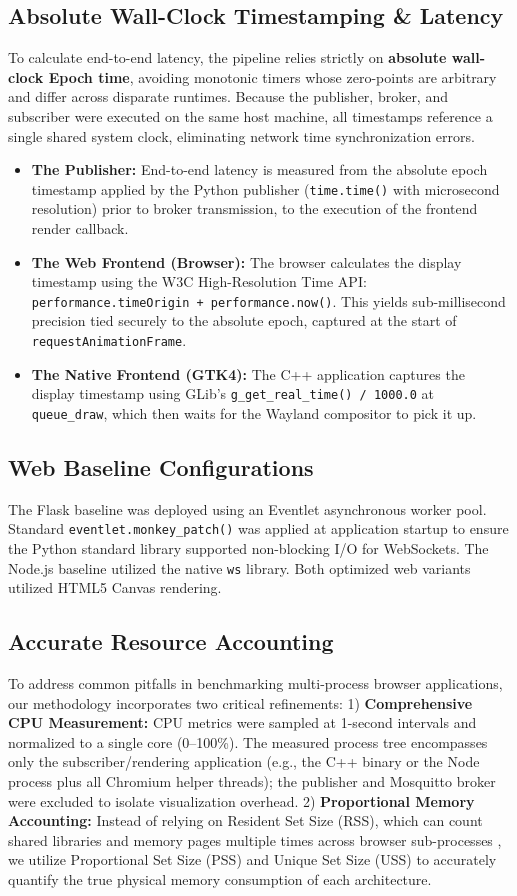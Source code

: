 \documentclass[lettersize,journal]{IEEEtran}
\begin{document}
\subsection{Absolute Wall-Clock Timestamping \& Latency}
To calculate end-to-end latency, the pipeline relies strictly on \textbf{absolute wall-clock Epoch time}, avoiding monotonic timers whose zero-points are arbitrary and differ across disparate runtimes. Because the publisher, broker, and subscriber were executed on the same host machine, all timestamps reference a single shared system clock, eliminating network time synchronization errors.
\begin{itemize}
    \item \textbf{The Publisher:} End-to-end latency is measured from the absolute epoch timestamp applied by the Python publisher (\texttt{time.time()} with microsecond resolution) prior to broker transmission, to the execution of the frontend render callback.
    \item \textbf{The Web Frontend (Browser):} The browser calculates the display timestamp using the W3C High-Resolution Time API: \texttt{performance.timeOrigin + performance.now()}. This yields sub-millisecond precision tied securely to the absolute epoch, captured at the start of \texttt{requestAnimationFrame}.
    \item \textbf{The Native Frontend (GTK4):} The C++ application captures the display timestamp using GLib's \texttt{g\_get\_real\_time() / 1000.0} at \texttt{queue\_draw}, which then waits for the Wayland compositor to pick it up.
\end{itemize}

\subsection{Web Baseline Configurations}
The Flask baseline was deployed using an Eventlet asynchronous worker pool. Standard \texttt{eventlet.monkey\_patch()} was applied at application startup to ensure the Python standard library supported non-blocking I/O for WebSockets. The Node.js baseline utilized the native \texttt{ws} library. Both optimized web variants utilized HTML5 Canvas rendering.

\subsection{Accurate Resource Accounting}
To address common pitfalls in benchmarking multi-process browser applications, our methodology incorporates two critical refinements:
1) \textbf{Comprehensive CPU Measurement:} CPU metrics were sampled at 1-second intervals and normalized to a single core (0--100\%). The measured process tree encompasses only the subscriber/rendering application (e.g., the C++ binary or the Node process plus all Chromium helper threads); the publisher and Mosquitto broker were excluded to isolate visualization overhead.
2) \textbf{Proportional Memory Accounting:} Instead of relying on Resident Set Size (RSS), which can count shared libraries and memory pages multiple times across browser sub-processes \cite{b5}, we utilize Proportional Set Size (PSS) and Unique Set Size (USS) to accurately quantify the true physical memory consumption of each architecture.
\end{document}

